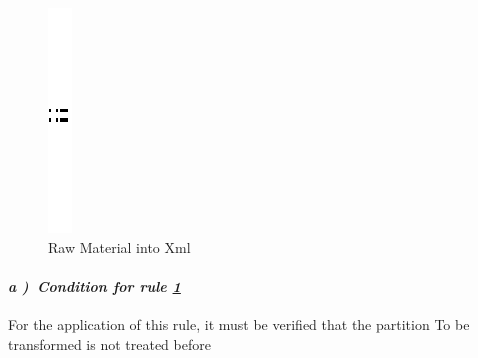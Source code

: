 \begin{figure}[th]
\centering

\quad{}
\includegraphics{Chapiter3/img/sep}
\quad{}
 
 
\caption{\label{fig:Raw Material into Xml}Raw Material into Xml} 

\end{figure} 

\paragraph{\emph{ a )~Condition for rule \ref{fig:Raw Material into Xml} } } For the application of this rule, it must be verified that the partition To be transformed is not treated before

